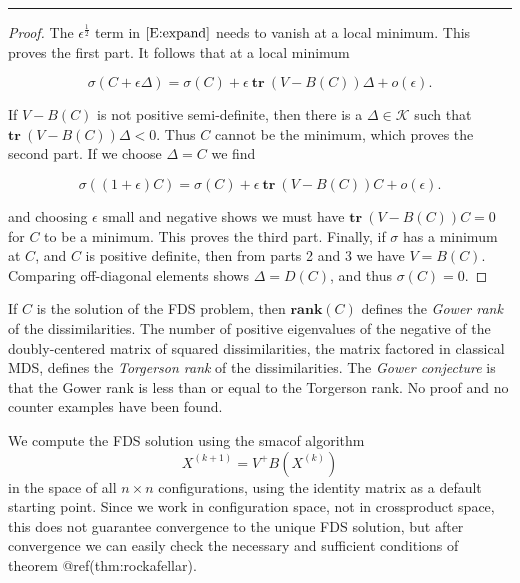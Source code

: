 \documentclass[
  12pt,
  letterpaper,
  DIV=11,
  numbers=noendperiod]{scrreprt}
\theoremstyle{remark}
\begin{document}
\begin{center}\rule{0.5\linewidth}{0.5pt}\end{center}

\begin{proof}
The \(\epsilon^\frac12\) term in \(\eqref{E:expand}\) needs to vanish at
a local minimum. This proves the first part. It follows that at a local
minimum

\begin{equation*}
\sigma(C+\epsilon\Delta)=\sigma(C)+
\epsilon\ \mathbf{tr}\ (V-B(C))\Delta+o(\epsilon).
\end{equation*}

If \(V-B(C)\) is not positive semi-definite, then there is a
\(\Delta\in\mathcal{K}\) such that \(\mathbf{tr}\ (V-B(C))\Delta < 0\).
Thus \(C\) cannot be the minimum, which proves the second part. If we
choose \(\Delta=C\) we find

\begin{equation*}
\sigma((1+\epsilon)C)=\sigma(C)+
\epsilon\ \mathbf{tr}\ (V-B(C))C+o(\epsilon).
\end{equation*}

and choosing \(\epsilon\) small and negative shows we must have
\(\mathbf{tr}\ (V-B(C))C=0\) for \(C\) to be a minimum. This proves the
third part. Finally, if \(\sigma\) has a minimum at \(C\), and \(C\) is
positive definite, then from parts 2 and 3 we have \(V=B(C)\). Comparing
off-diagonal elements shows \(\Delta=D(C)\), and thus \(\sigma(C)=0\).
\end{proof}

If \(C\) is the solution of the FDS problem, then \(\mathbf{rank}(C)\)
defines the \emph{Gower rank} of the dissimilarities. The number of
positive eigenvalues of the negative of the doubly-centered matrix of
squared dissimilarities, the matrix factored in classical MDS, defines
the \emph{Torgerson rank} of the dissimilarities. The \emph{Gower
conjecture} is that the Gower rank is less than or equal to the
Torgerson rank. No proof and no counter examples have been found.

We compute the FDS solution using the smacof algorithm \begin{equation}
X^{(k+1)}=V^+B(X^{(k)})
\end{equation} in the space of all \(n\times n\) configurations, using
the identity matrix as a default starting point. Since we work in
configuration space, not in crossproduct space, this does not guarantee
convergence to the unique FDS solution, but after convergence we can
easily check the necessary and sufficient conditions of theorem
@ref(thm:rockafellar).
\end{document}
